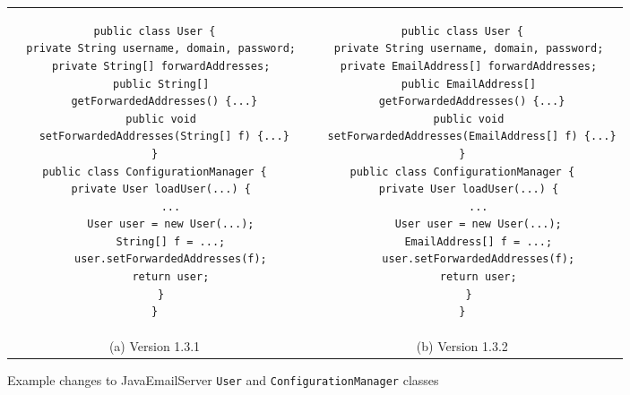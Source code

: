 \begin{figure*}[t]
\begin{tabular}{c|c}
\begin{minipage}{3in}
\begin{footnotesize}
\begin{verbatim}
public class User {
  private String username, domain, password;
  private String[] forwardAddresses;
  public String[]
   getForwardedAddresses() {...}
  public void
   setForwardedAddresses(String[] f) {...}
}
public class ConfigurationManager {
  private User loadUser(...) {
     ...
     User user = new User(...);
     String[] f = ...;
     user.setForwardedAddresses(f);
     return user;
  }
}
\end{verbatim}
\end{footnotesize}
\end{minipage} &
\begin{minipage}{3.15in}
\begin{footnotesize}
\begin{verbatim}
public class User {
  private String username, domain, password;
  private EmailAddress[] forwardAddresses;
  public EmailAddress[]
   getForwardedAddresses() {...}
  public void
   setForwardedAddresses(EmailAddress[] f) {...}
}
public class ConfigurationManager {
  private User loadUser(...) {
     ...
     User user = new User(...);
     EmailAddress[] f = ...;
     user.setForwardedAddresses(f);
     return user;
  }
}
\end{verbatim}
\end{footnotesize}
\end{minipage} \\
(a) Version 1.3.1 &
(b) Version 1.3.2 \\
\end{tabular}
\caption{Example changes to JavaEmailServer \texttt{User} and
  \texttt{ConfigurationManager} classes}
\label{fig:email-example}
\end{figure*}
